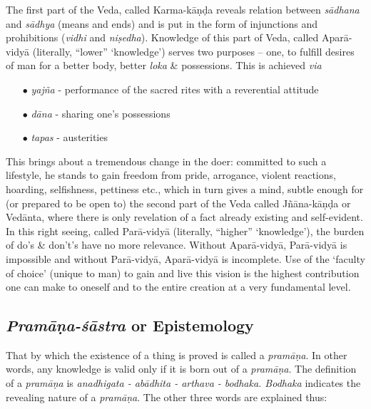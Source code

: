 The first part of the Veda, called Karma-kāṇḍa reveals relation between  {\sl sādhana} and {\sl sādhya} (means and ends) and is put in the form of injunctions and prohibitions ({\sl vidhi} and {\sl niṣedha}). Knowledge of this part of Veda, called Aparā-vidyā (literally, ``lower'' `knowledge') serves two purposes -- one, to fulﬁll desires of man for a better body, better {\sl loka} \& possessions. This is achieved {\sl via}
\begin{itemize}
\itemsep=0pt
\item[$\bullet$] {\sl yajña} - performance of the sacred rites with a reverential attitude 
\item[$\bullet$] {\sl dāna} - sharing one's possessions
\item[$\bullet$] {\sl tapas} - austerities 
\end{itemize}
This brings about a tremendous change in the doer: committed to such a lifestyle, he stands to gain freedom from pride, arrogance, violent reactions, hoarding, selﬁshness, pettiness etc., which in turn gives a mind, subtle enough for (or prepared to be open to) the second part of the Veda called Jñāna-kāṇḍa or Vedānta, where there is only revelation of a fact already existing and self-evident. In this right seeing, called Parā-vidyā (literally, ``higher'' `knowledge'), the burden of do’s \& don't's have no more relevance. Without Aparā-vidyā, Parā-vidyā is impossible and without Parā-vidyā, Aparā-vidyā is incomplete. Use of the `faculty of choice' (unique to man) to gain and live this vision is the highest contribution one can make to oneself and to the entire creation at a very fundamental level.\\[-20pt]

\subsection{{{\sl\bfseries Pramāṇa-śāstra}\relax} or Epistemology}\label{art12-sec2.2}

That by which the existence of a thing is proved is called a {\sl pramāṇa}. In other words, any knowledge is valid only if it is born out of a {\sl pramāṇa}. The deﬁnition of a {\sl pramāṇa}  is {\sl anadhigata - abādhita - arthava - bodhaka. Bodhaka} indicates the revealing nature of a {\sl pramāṇa}. The other three words are explained thus:

